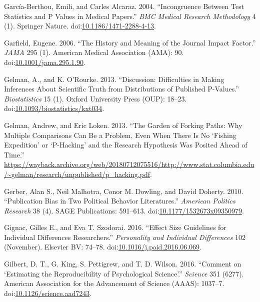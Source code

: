 \documentclass[a5paper]{book}
\begin{document}
\hypertarget{ref-doi:10.1186ux2f1471-2288-4-13}{}
García-Berthou, Emili, and Carles Alcaraz. 2004. ``Incongruence Between
Test Statistics and P Values in Medical Papers.'' \emph{BMC Medical
Research Methodology} 4 (1). Springer Nature.
doi:\href{https://doi.org/10.1186/1471-2288-4-13}{10.1186/1471-2288-4-13}.

\hypertarget{ref-doi:10.1001ux2fjama.295.1.90}{}
Garfield, Eugene. 2006. ``The History and Meaning of the Journal Impact
Factor.'' \emph{JAMA} 295 (1). American Medical Association (AMA): 90.
doi:\href{https://doi.org/10.1001/jama.295.1.90}{10.1001/jama.295.1.90}.

\hypertarget{ref-doi:10.1093ux2fbiostatisticsux2fkxt034}{}
Gelman, A., and K. O'Rourke. 2013. ``Discussion: Difficulties in Making
Inferences About Scientific Truth from Distributions of Published
P-Values.'' \emph{Biostatistics} 15 (1). Oxford University Press (OUP):
18--23.
doi:\href{https://doi.org/10.1093/biostatistics/kxt034}{10.1093/biostatistics/kxt034}.

\hypertarget{ref-gelman-forking}{}
Gelman, Andrew, and Eric Loken. 2013. ``The Garden of Forking Paths: Why
Multiple Comparisons Can Be a Problem, Even When There Is No `Fishing
Expedition' or `P-Hacking' and the Research Hypothesis Was Posited Ahead
of Time.''
\url{https://wayback.archive.org/web/20180712075516/http://www.stat.columbia.edu/~gelman/research/unpublished/p_hacking.pdf}.

\hypertarget{ref-doi:10.1177ux2f1532673x09350979}{}
Gerber, Alan S., Neil Malhotra, Conor M. Dowling, and David Doherty.
2010. ``Publication Bias in Two Political Behavior Literatures.''
\emph{American Politics Research} 38 (4). SAGE Publications: 591--613.
doi:\href{https://doi.org/10.1177/1532673x09350979}{10.1177/1532673x09350979}.

\hypertarget{ref-doi:10.1016ux2fj.paid.2016.06.069}{}
Gignac, Gilles E., and Eva T. Szodorai. 2016. ``Effect Size Guidelines
for Individual Differences Researchers.'' \emph{Personality and
Individual Differences} 102 (November). Elsevier BV: 74--78.
doi:\href{https://doi.org/10.1016/j.paid.2016.06.069}{10.1016/j.paid.2016.06.069}.

\hypertarget{ref-doi:10.1126ux2fscience.aad7243}{}
Gilbert, D. T., G. King, S. Pettigrew, and T. D. Wilson. 2016. ``Comment
on `Estimating the Reproducibility of Psychological Science'.''
\emph{Science} 351 (6277). American Association for the Advancement of
Science (AAAS): 1037--7.
doi:\href{https://doi.org/10.1126/science.aad7243}{10.1126/science.aad7243}.
\end{document}
